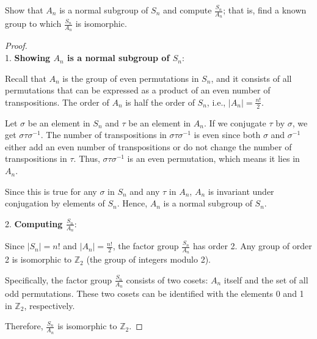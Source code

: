 \documentclass[12pt]{amsart}
\theoremstyle{definition}
\numberwithin{equation}{section}
\theoremstyle{plain}
\newcommand{\Z}{\mathbb{Z}}
\begin{document}
\begin{exercise}{24} Show that $A_n$ is a normal subgroup of $S_n$ and compute $\frac{S_n}{A_n}$; that is, find a known group to which $\frac{S_n}{A_n}$ is isomorphic.
    
    \begin{proof} $ $ \\
    1. \textbf{Showing \(A_n\) is a normal subgroup of \(S_n\)}:
       
       Recall that \(A_n\) is the group of even permutations in \(S_n\), and it consists of all permutations that can be expressed as a product of an even number of transpositions. The order of \(A_n\) is half the order of \(S_n\), i.e., \( |A_n| = \frac{n!}{2} \).
       
       Let \( \sigma \) be an element in \(S_n\) and \( \tau \) be an element in \(A_n\). If we conjugate \( \tau \) by \( \sigma \), we get \( \sigma \tau \sigma^{-1} \). The number of transpositions in \( \sigma \tau \sigma^{-1} \) is even since both \( \sigma \) and \( \sigma^{-1} \) either add an even number of transpositions or do not change the number of transpositions in \( \tau \). Thus, \( \sigma \tau \sigma^{-1} \) is an even permutation, which means it lies in \(A_n\). 
    
       Since this is true for any \( \sigma \) in \(S_n\) and any \( \tau \) in \(A_n\), \(A_n\) is invariant under conjugation by elements of \(S_n\). Hence, \(A_n\) is a normal subgroup of \(S_n\).
    
    2. \textbf{Computing \( \frac{S_n}{A_n} \)}:
    
       Since \( |S_n| = n! \) and \( |A_n| = \frac{n!}{2} \), the factor group \( \frac{S_n}{A_n} \) has order 2. Any group of order 2 is isomorphic to \( \Z_2 \) (the group of integers modulo 2). 
    
       Specifically, the factor group \( \frac{S_n}{A_n} \) consists of two cosets: \(A_n\) itself and the set of all odd permutations. These two cosets can be identified with the elements 0 and 1 in \( \Z_2 \), respectively.
    
       Therefore, \( \frac{S_n}{A_n} \) is isomorphic to \( \Z_2 \).
    
    \end{proof}
\end{exercise}
\vspace*{20pt}
\end{document}
